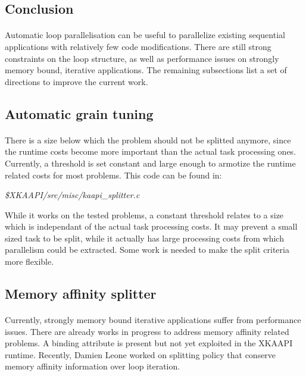 \documentclass[a4paper, 11pt]{article}
\begin{document}
\subsection{Conclusion}
\paragraph{}
Automatic loop parallelisation can be useful to parallelize existing sequential
applications with relatively few code modifications. There are still strong
constraints on the loop structure, as well as performance issues on strongly
memory bound, iterative applications. The remaining subsections list a set of
directions to improve the current work.

\subsection{Automatic grain tuning}
\paragraph{}
There is a size below which the problem should not be splitted anymore, since
the runtime costs become more important than the actual task processing ones.
Currently, a threshold is set constant and large enough to armotize the runtime
related costs for most problems. This code can be found in:
\begin{center}
  \textit{\$XKAAPI/src/misc/kaapi\_splitter.c}
\end{center}
While it works on the tested problems, a constant threshold relates to a size which
is independant of the actual task processing costs. It may prevent a small sized task
to be split, while it actually has large processing costs from which parallelism could
be extracted. Some work is needed to make the split criteria more flexible.

\subsection{Memory affinity splitter}
\paragraph{}
Currently, strongly memory bound iterative applications suffer from performance issues.
There are already works in progress to address memory affinity related problems. A binding
attribute is present but not yet exploited in the XKAAPI runtime. Recently, Damien Leone
worked on splitting policy that conserve memory affinity information over loop iteration.
\end{document}
